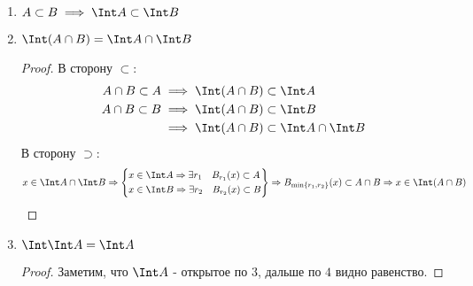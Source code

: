 \begin{properties}
\begin{enumerate}
\begin{proof}
                Необходимость ($\implies$): $\Int A$ открыто.

                Достаточность ($\impliedby$): $A$ открыто $\implies$ все точки внутренние $\implies$ $A = \Int A$.
            \end{proof}
        \item $A \subset B \implies \Int A \subset \Int B$
        \item $\Int (A\cap B) = \Int A\cap \Int B$
            \begin{proof} \thmslashn

                В сторону $ \subset $:
                \begin{equation*}
                    \begin{split}
                        A\cap B \subset A 
                        &\implies \Int (A\cap B) \subset \Int A\\
                        A\cap B \subset B 
                        &\implies \Int (A\cap B) \subset \Int B\\
                        &\implies \Int (A\cap B) \subset \Int A\cap \Int B
                    \end{split}
                \end{equation*}
                В сторону $\supset$:
                \begin{equation*}
                    x\in \Int A\cap \Int B \Rightarrow
                    \left\{
                        \begin{split}
                            x&\in \Int A \Rightarrow \exists{r_1}\quad B_{r_1}(x) \subset A\\
                            x&\in \Int B \Rightarrow \exists{r_2}\quad B_{r_2}(x) \subset B\\
                        \end{split}
                    \right\} \Rightarrow
                    B_{\min \{r_1, r_2\} }(x) \subset A\cap B  \Rightarrow
                    x\in \Int (A\cap B)
                \end{equation*}
            \end{proof}
        \item $\Int \Int A = \Int A$
             \begin{proof} \thmslashn
            
                Заметим, что $\Int A$ - открытое по $3$, дальше по $4$ видно равенство.
            \end{proof}
    \end{enumerate}
\end{properties}
